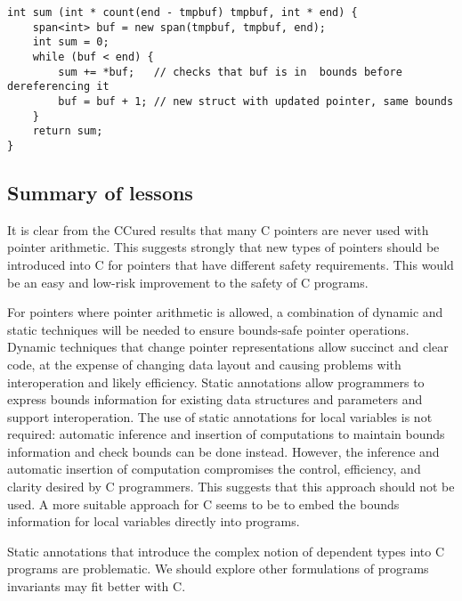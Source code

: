 \begin{verbatim}
int sum (int * count(end - tmpbuf) tmpbuf, int * end) {
    span<int> buf = new span(tmpbuf, tmpbuf, end);
    int sum = 0;
    while (buf < end) {
        sum += *buf;   // checks that buf is in  bounds before dereferencing it        
        buf = buf + 1; // new struct with updated pointer, same bounds
    }
    return sum;
}
\end{verbatim}

\subsection{Summary of lessons}

It is clear from the CCured results that many C pointers are never used
with pointer arithmetic. This suggests strongly that new types of
pointers should be introduced into C for pointers that have different
safety requirements. This would be an easy and low-risk improvement to
the safety of C programs.

For pointers where pointer arithmetic is allowed, a combination of
dynamic and static techniques will be needed to ensure bounds-safe pointer
operations. Dynamic techniques that change pointer representations allow
succinct and clear code, at the expense of changing data layout and
causing problems with interoperation and likely efficiency. Static
annotations allow programmers to express bounds information for existing
data structures and parameters and support interoperation. The use of
static annotations for local variables is not required: automatic
inference and insertion of computations to maintain bounds information
and check bounds can be done instead. However, the inference and
automatic insertion of computation compromises the control, efficiency,
and clarity desired by C programmers. This suggests that this approach
should not be used. A more suitable approach for C seems to be to embed
the bounds information for local variables directly into programs.

Static annotations that introduce the complex notion of dependent types
into C programs are problematic. We should explore other formulations of
programs invariants may fit better with C.

